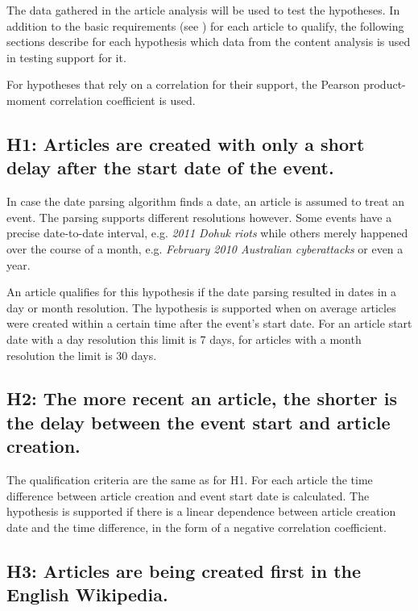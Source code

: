 The data gathered in the article analysis will be used to test the hypotheses.
In addition to the basic requirements (see ) for each article to qualify, the following sections describe for each hypothesis which data from the content analysis is used in testing support for it.

For hypotheses that rely on a correlation for their support, the Pearson product-moment correlation coefficient is used.

\subsection*{H1: Articles are created with only a short delay after the start date of the event.}

In case the date parsing algorithm finds a date, an article is assumed to treat an event.
The parsing supports different resolutions however.
Some events have a precise date-to-date interval, e.g. \emph{2011 Dohuk riots} while others merely happened over the course of a month, e.g. \emph{February 2010 Australian cyberattacks} or even a year.

An article qualifies for this hypothesis if the date parsing resulted in dates in a day or month resolution.
The hypothesis is supported when on average articles were created within a certain time after the event's start date.
For an article start date with a day resolution this limit is 7 days, for articles with a month resolution the limit is 30 days.

\subsection*{H2: The more recent an article, the shorter is the delay between the event start and article creation.}

The qualification criteria are the same as for H1. 
For each article the time difference between article creation and event start date is calculated. 
The hypothesis is supported if there is a linear dependence between article creation date and the time difference, in the form of a negative correlation coefficient.

\subsection*{H3: Articles are being created first in the English Wikipedia.}

